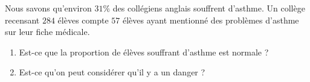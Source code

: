 
\begin{exercice}\label{exosmath-0348}

    Nous savons qu'environ \( 31\%\) des collégiens anglais souffrent d'asthme. Un collège recensant \( 284\) élèves compte \( 57\) élèves ayant mentionné des problèmes d'asthme sur leur fiche médicale.
    \begin{enumerate}
        \item
            Est-ce que la proportion de élèves souffrant d'asthme est normale ?
        \item
            Est-ce qu'on peut considérer qu'il y a un danger ?
    \end{enumerate}

\end{exercice}
